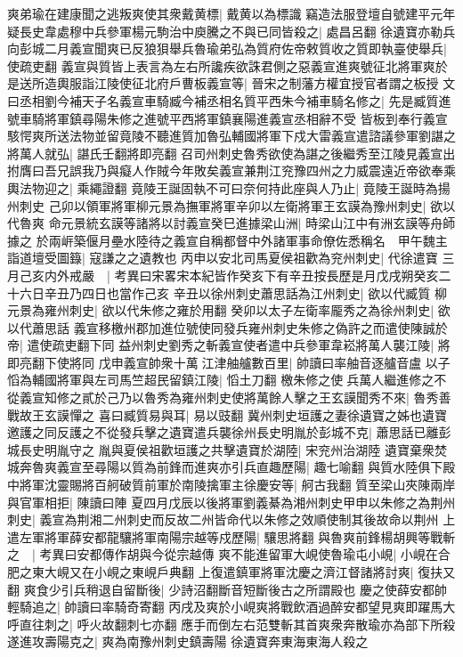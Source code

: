 爽弟瑜在建康聞之逃叛爽使其衆戴黄標|{
	戴黄以為標識}
竊造法服登壇自號建平元年疑長史韋處穆中兵參軍楊元駒治中庾騰之不與已同皆殺之|{
	處昌呂翻}
徐遺寶亦勒兵向彭城二月義宣聞爽已反狼狽舉兵魯瑜弟弘為質府佐帝敕質收之質即執臺使舉兵|{
	使疏吏翻}
義宣與質皆上表言為左右所讒疾欲誅君側之惡義宣進爽號征北將軍爽於是送所造輿服詣江陵使征北府戶曹板義宣等|{
	晉宋之制藩方權宜授官者謂之板授}
文曰丞相劉今補天子名義宣車騎臧今補丞相名質平西朱今補車騎名修之|{
	先是臧質進號車騎將軍鎮尋陽朱修之進號平西將軍鎮襄陽進義宣丞相辭不受}
皆板到奉行義宣駭愕爽所送法物並留竟陵不聽進質加魯弘輔國將軍下戍大雷義宣遣諮議參軍劉諶之將萬人就弘|{
	諶氏壬翻將即亮翻}
召司州刺史魯秀欲使為諶之後繼秀至江陵見義宣出拊膺曰吾兄誤我乃與癡人作賊今年敗矣義宣兼荆江兖豫四州之力威震遠近帝欲奉乘輿法物迎之|{
	乘繩證翻}
竟陵王誕固執不可曰奈何持此座與人乃止|{
	竟陵王誕時為揚州刺史}
己卯以領軍將軍柳元景為撫軍將軍辛卯以左衛將軍王玄謨為豫州刺史|{
	欲以代魯爽}
命元景統玄謨等諸將以討義宣癸巳進據梁山洲|{
	時梁山江中有洲玄謨等舟師據之}
於兩㟁築偃月壘水陸待之義宣自稱都督中外諸軍事命僚佐悉稱名　甲午魏主詣道壇受圖籙|{
	寇謙之之遺教也}
丙申以安北司馬夏侯祖歡為兖州刺史|{
	代徐遣寶}
三月己亥内外戒嚴　|{
	考異曰宋畧宋本紀皆作癸亥下有辛丑按長歷是月戊戌朔癸亥二十六日辛丑乃四日也當作己亥}
辛丑以徐州刺史蕭思話為江州刺史|{
	欲以代臧質}
柳元景為雍州刺史|{
	欲以代朱修之雍於用翻}
癸卯以太子左衛率龎秀之為徐州刺史|{
	欲以代蕭思話}
義宣移檄州郡加進位號使同發兵雍州刺史朱修之偽許之而遣使陳誠於帝|{
	遣使疏吏翻下同}
益州刺史劉秀之斬義宣使者遣中兵參軍韋崧將萬人襲江陵|{
	將即亮翻下使將同}
戊申義宣帥衆十萬江津舳艫數百里|{
	帥讀曰率舳音逐艫音盧}
以子慆為輔國將軍與左司馬竺超民留鎮江陵|{
	慆土刀翻}
檄朱修之使兵萬人繼進修之不從義宣知修之貳於己乃以魯秀為雍州刺史使將萬餘人擊之王玄謨聞秀不來|{
	魯秀善戰故王玄謨憚之}
喜曰臧質易與耳|{
	易以豉翻}
冀州刺史垣護之妻徐遺寶之姊也遺寶邀護之同反護之不從發兵擊之遺寶遣兵襲徐州長史明胤於彭城不克|{
	蕭思話已離彭城長史明胤守之}
胤與夏侯祖歡垣護之共擊遺寶於湖陸|{
	宋兖州治湖陸}
遺寶棄衆焚城奔魯爽義宣至尋陽以質為前鋒而進爽亦引兵直趣歷陽|{
	趣七喻翻}
與質水陸俱下殿中將軍沈靈賜將百舸破質前軍於南陵擒軍主徐慶安等|{
	舸古我翻}
質至梁山夾陳兩岸與官軍相拒|{
	陳讀曰陣}
夏四月戊辰以後將軍劉義綦為湘州刺史甲申以朱修之為荆州刺史|{
	義宣為荆湘二州刺史而反故二州皆命代以朱修之效順使制其後故命以荆州}
上遣左軍將軍薛安都龍驤將軍南陽宗越等戍歷陽|{
	驤思將翻}
與魯爽前鋒楊胡興等戰斬之　|{
	考異曰安都傳作胡與今從宗越傳}
爽不能進留軍大峴使魯瑜屯小峴|{
	小峴在合肥之東大峴又在小峴之東峴戶典翻}
上復遣鎮軍將軍沈慶之濟江督諸將討爽|{
	復扶又翻}
爽食少引兵稍退自留斷後|{
	少詩沼翻斷音短斷後古之所謂殿也}
慶之使薛安都帥輕騎追之|{
	帥讀曰率騎奇寄翻}
丙戌及爽於小峴爽將戰飲酒過醉安都望見爽即躍馬大呼直往刺之|{
	呼火故翻刺七亦翻}
應手而倒左右范雙斬其首爽衆奔散瑜亦為部下所殺遂進攻壽陽克之|{
	爽為南豫州刺史鎮壽陽}
徐遺寶奔東海東海人殺之


